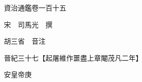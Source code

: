 










 


 
 


 

  
  
  
  
  





  
  
  
  
  
 
  

  

  
  
  



  

 
 

  
   




  

  
  


  　　資治通鑑卷一百十五

　　宋　司馬光　撰

　　胡三省　音注

　　晉紀三十七【起屠維作噩盡上章閹茂凡二年】

　　安皇帝庚

